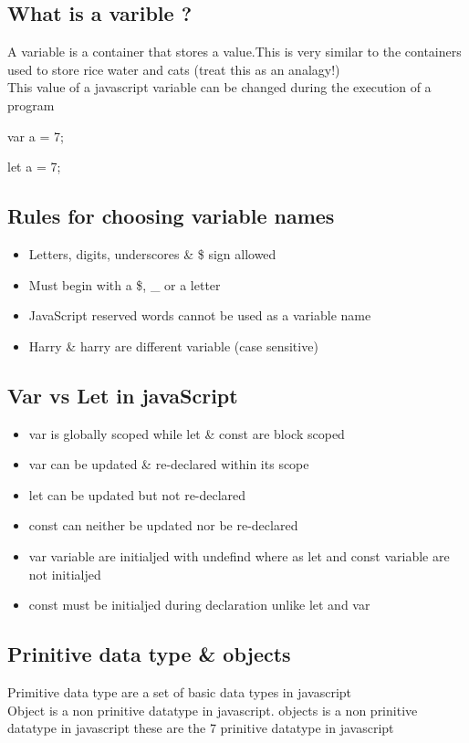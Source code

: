 \documentclass[11pt]{article}
\begin{document}
\subsection*{What is a varible ?}
\label{sec:orga7de24d}
A variable is a container that stores a value.This is very similar to the containers used to store rice water and cats (treat this as an analagy!) \\
This value of a javascript variable can be changed during the execution of a program

var a = 7;

let a = 7;
\subsection*{Rules for choosing variable names}
\label{sec:orgce824e2}
\begin{itemize}
\item Letters, digits, underscores \& \$ sign allowed
\item Must begin with a \$, \_ or a letter
\item JavaScript reserved words cannot be used as a variable name
\item Harry \& harry are different variable (case sensitive)
\end{itemize}
\subsection*{Var vs Let in javaScript}
\label{sec:org2bb30dc}
\begin{itemize}
\item var is globally scoped while let \& const are block scoped
\item var can be updated \& re-declared within its scope
\item let can be updated but not re-declared
\item const can neither be updated nor be re-declared
\item var variable are initialjed with undefind where as let and const variable are not initialjed
\item const must be initialjed during declaration unlike let and var
\end{itemize}
\subsection*{Prinitive data type \& objects}
\label{sec:org61062a3}
Primitive data type are a set of basic data types in javascript \\
Object is a non prinitive datatype in javascript.
objects is a non prinitive datatype in javascript
these are the 7 prinitive datatype in javascript
\end{document}
